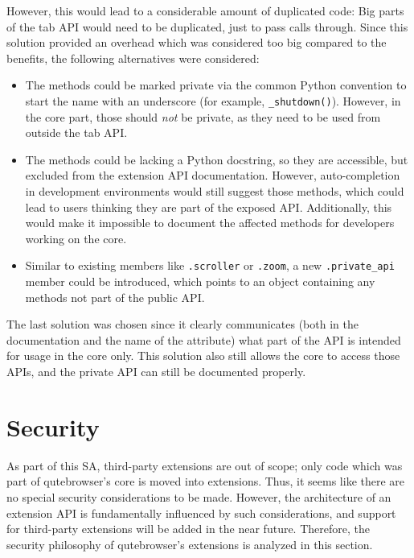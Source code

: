 \documentclass[a4paper,parskip=full]{scrreprt}
\newcommand{\py}[1]{\texttt{#1}}
\begin{document}
However, this would lead to a considerable amount of duplicated code: Big parts
of the tab API would need to be duplicated, just to pass calls through. Since
this solution provided an overhead which was considered too big compared to the
benefits, the following alternatives were considered:

\begin{itemize}
  \item The methods could be marked private via the common Python convention to
    start the name with an underscore (for example, \py{_shutdown()}).
    However, in the core part, those should \emph{not} be private, as they need to
    be used from outside the tab API.
  \item The methods could be lacking a Python docstring, so they are accessible,
    but excluded from the extension API documentation. However, auto-completion
    in development environments would still suggest those methods, which could
    lead to users thinking they are part of the exposed API. Additionally, this
    would make it impossible to document the affected methods for developers
    working on the core.
  \item Similar to existing members like \verb|.scroller| or \verb|.zoom|, a new
    \verb|.private_api| member could be introduced, which points to an object
    containing any methods not part of the public API.
\end{itemize}

The last solution was chosen since it clearly communicates (both in the
documentation and the name of the attribute) what part of the API is intended
for usage in the core only. This solution also still allows the core to access
those APIs, and the private API can still be documented properly.

\section{Security}
\label{security}
As part of this SA, third-party extensions are out of scope; only code which was
part of qutebrowser's core is moved into extensions. Thus, it seems like there
are no special security considerations to be made. However, the architecture of
an extension API is fundamentally influenced by such considerations, and support
for third-party extensions will be added in the near future. Therefore, the
security philosophy of qutebrowser's extensions is analyzed in this section.
\end{document}
